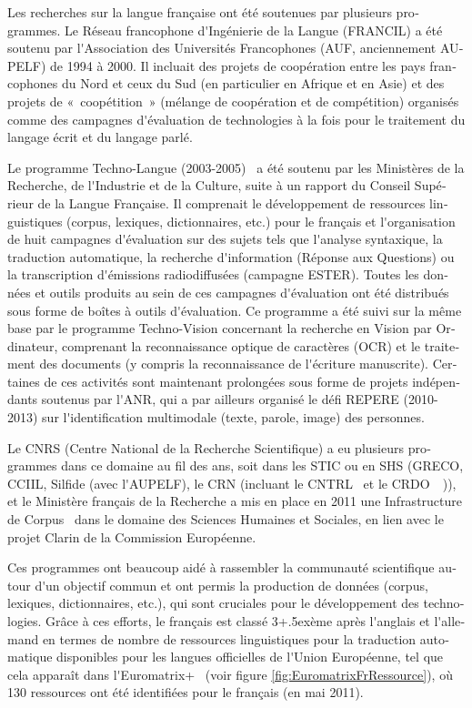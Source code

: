 \begin{french}
\begin{multicols}{2}
Les recherches sur la langue française ont été soutenues par plusieurs
programmes. Le Réseau francophone d{\mbox '}Ingénierie de la Langue
(FRANCIL) a été soutenu par l{\mbox '}Association des Universités
Francophones (AUF, anciennement AUPELF) de 1994 à 2000. Il incluait
des projets de coopération entre les pays francophones du Nord et ceux
du Sud (en particulier en Afrique et en Asie) et des projets de
«~coopétition~» (mélange de coopération et de compétition) organisés comme
des campagnes d{\mbox '}évaluation de technologies à la fois pour le
traitement du langage écrit et du langage parlé.

Le programme Techno-Langue (2003-2005)~\cite{technolangue} a été
soutenu par les Ministères de la Recherche, de l{\mbox '}Industrie et
de la Culture, suite à un rapport du Conseil Supérieur de la Langue
Française. Il comprenait le développement de ressources linguistiques
(corpus, lexiques, dictionnaires, etc.) pour le français et l{\mbox
  '}organisation de huit campagnes d{\mbox '}évaluation sur des sujets
tels que l{\mbox '}analyse syntaxique, la traduction automatique, la
recherche d{\mbox '}information (Réponse aux Questions) ou la
transcription d{\mbox '}émissions radiodiffusées (campagne
ESTER). Toutes les données et outils produits au sein de ces campagnes
d{\mbox '}évaluation ont été distribués sous forme de boîtes à outils
d{\mbox '}évaluation. Ce programme a été suivi sur la même base par le
programme Techno-Vision concernant la recherche en Vision par
Ordinateur, comprenant la reconnaissance optique de caractères (OCR)
et le traitement des documents (y compris la reconnaissance de l{\mbox
  '}écriture manuscrite). Certaines de ces activités sont maintenant
prolongées sous forme de projets indépendants soutenus par l{\mbox
  '}ANR, qui a par ailleurs organisé le défi REPERE (2010-2013) sur
l{\mbox '}identification multimodale (texte, parole, image) des
personnes.

Le CNRS (Centre National de la Recherche Scientifique) a eu plusieurs
programmes dans ce domaine au fil des ans, soit dans les STIC ou en
SHS (GRECO, CCIIL, Silfide (avec l{\mbox '}AUPELF), le CRN (incluant le CNTRL~\cite{cnrtl}
et le CRDO~\cite{crdo}~\cite{crdo2})), et le Ministère français de la Recherche a mis en
place en 2011 une Infrastructure de Corpus~\cite{infracorpus} dans le domaine des
Sciences Humaines et Sociales, en lien avec le projet Clarin de la
Commission Européenne.

Ces programmes ont beaucoup aidé à rassembler la communauté
scientifique autour d{\mbox '}un objectif commun et ont permis la production
de données (corpus, lexiques, dictionnaires, etc.), qui sont cruciales
pour le développement des technologies. Grâce à ces efforts, le
français est classé 3\raise+.5ex\hbox{ème} après l{\mbox '}anglais et l{\mbox '}allemand en termes de
nombre de ressources linguistiques pour la traduction automatique
disponibles pour les langues officielles de l{\mbox '}Union Européenne, tel
que cela apparaît dans l{\mbox '}Euromatrix+~\cite{euromatrixplus} (voir figure \ref{fig:EuromatrixFrRessource}), où 130
ressources ont été identifiées pour le français (en mai 2011).


\end{multicols}
\end{french}
